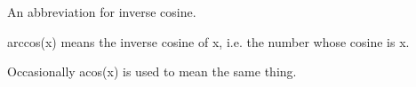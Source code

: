 An abbreviation for inverse cosine.
\par
arccos(x) means the inverse cosine of x, i.e. the number whose
cosine is x.
\par
Occasionally acos(x) is used to mean the same thing.